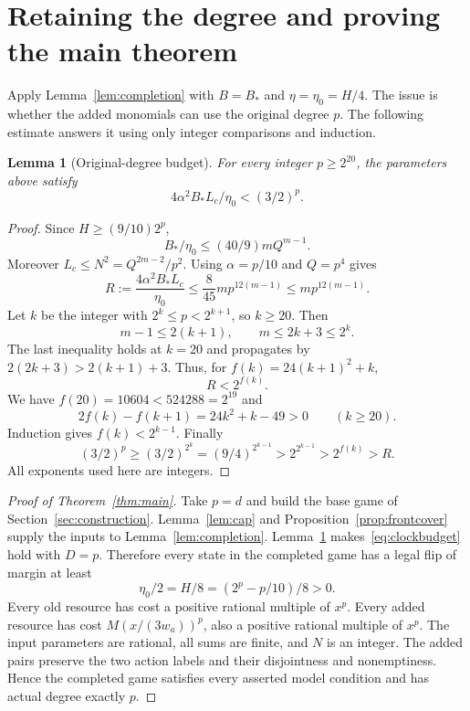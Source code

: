 \documentclass[11pt]{article}
\newtheorem{lemma}[theorem]{Lemma}
\theoremstyle{definition}
\theoremstyle{remark}
\begin{document}
\section{Retaining the degree and proving the main theorem}\label{sec:degree}
Apply Lemma~\ref{lem:completion} with $B=B_*$ and $\eta=\eta_0=H/4$. The issue is whether the added monomials can use the original degree $p$. The following estimate answers it using only integer comparisons and induction.

\begin{lemma}[Original-degree budget]\label{lem:degree}
For every integer $p\ge2^{20}$, the parameters above satisfy
\[
 4\alpha^2B_*L_c/\eta_0<(3/2)^p.
\]
\end{lemma}
\begin{proof}
Since $H\ge(9/10)2^p$,
\[
 B_*/\eta_0\le(40/9)mQ^{m-1}.
\]
Moreover $L_c\le N^2=Q^{2m-2}/p^2$. Using $\alpha=p/10$ and $Q=p^4$ gives
\begin{equation}\label{eq:budgetmajorant}
 R:=\frac{4\alpha^2B_*L_c}{\eta_0}
 \le\frac8{45}m p^{12(m-1)}\le m p^{12(m-1)}.
\end{equation}
Let $k$ be the integer with $2^k\le p<2^{k+1}$, so $k\ge20$. Then
\[
 m-1\le2(k+1),\qquad m\le2k+3\le2^k.
\]
The last inequality holds at $k=20$ and propagates by $2(2k+3)>2(k+1)+3$. Thus, for $f(k)=24(k+1)^2+k$,
\[
 R<2^{f(k)}.
\]
We have $f(20)=10604<524288=2^{19}$ and
\[
 2f(k)-f(k+1)=24k^2+k-49>0\qquad(k\ge20).
\]
Induction gives $f(k)<2^{k-1}$. Finally
\[
 (3/2)^p\ge(3/2)^{2^k}=(9/4)^{2^{k-1}}
 >2^{2^{k-1}}>2^{f(k)}>R.
\]
All exponents used here are integers.
\end{proof}

\begin{proof}[Proof of Theorem~\ref{thm:main}]
Take $p=d$ and build the base game of Section~\ref{sec:construction}. Lemma~\ref{lem:cap} and Proposition~\ref{prop:frontcover} supply the inputs to Lemma~\ref{lem:completion}. Lemma~\ref{lem:degree} makes~\eqref{eq:clockbudget} hold with $D=p$. Therefore every state in the completed game has a legal flip of margin at least
\[
 \eta_0/2=H/8=(2^p-p/10)/8>0.
\]
Every old resource has cost a positive rational multiple of $x^p$. Every added resource has cost $M(x/(3w_a))^p$, also a positive rational multiple of $x^p$. The input parameters are rational, all sums are finite, and $N$ is an integer. The added pairs preserve the two action labels and their disjointness and nonemptiness. Hence the completed game satisfies every asserted model condition and has actual degree exactly $p$.
\end{proof}
\end{document}
